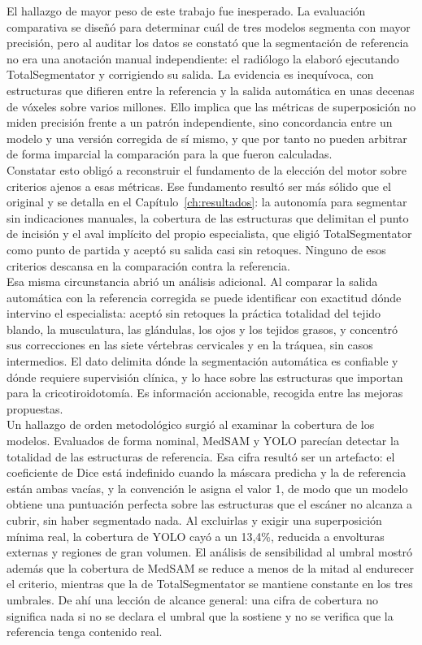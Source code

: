 El hallazgo de mayor peso de este trabajo fue inesperado. La evaluación comparativa se diseñó para determinar cuál de tres modelos segmenta con mayor precisión, pero al auditar los datos se constató que la segmentación de referencia no era una anotación manual independiente: el radiólogo la elaboró ejecutando TotalSegmentator y corrigiendo su salida. La evidencia es inequívoca, con estructuras que difieren entre la referencia y la salida automática en unas decenas de vóxeles sobre varios millones. Ello implica que las métricas de superposición no miden precisión frente a un patrón independiente, sino concordancia entre un modelo y una versión corregida de sí mismo, y que por tanto no pueden arbitrar de forma imparcial la comparación para la que fueron calculadas.\\

Constatar esto obligó a reconstruir el fundamento de la elección del motor sobre criterios ajenos a esas métricas. Ese fundamento resultó ser más sólido que el original y se detalla en el Capítulo~\ref{ch:resultados}: la autonomía para segmentar sin indicaciones manuales, la cobertura de las estructuras que delimitan el punto de incisión y el aval implícito del propio especialista, que eligió TotalSegmentator como punto de partida y aceptó su salida casi sin retoques. Ninguno de esos criterios descansa en la comparación contra la referencia.\\

Esa misma circunstancia abrió un análisis adicional. Al comparar la salida automática con la referencia corregida se puede identificar con exactitud dónde intervino el especialista: aceptó sin retoques la práctica totalidad del tejido blando, la musculatura, las glándulas, los ojos y los tejidos grasos, y concentró sus correcciones en las siete vértebras cervicales y en la tráquea, sin casos intermedios. El dato delimita dónde la segmentación automática es confiable y dónde requiere supervisión clínica, y lo hace sobre las estructuras que importan para la cricotiroidotomía. Es información accionable, recogida entre las mejoras propuestas.\\

Un hallazgo de orden metodológico surgió al examinar la cobertura de los modelos. Evaluados de forma nominal, MedSAM y YOLO parecían detectar la totalidad de las estructuras de referencia. Esa cifra resultó ser un artefacto: el coeficiente de Dice está indefinido cuando la máscara predicha y la de referencia están ambas vacías, y la convención le asigna el valor 1, de modo que un modelo obtiene una puntuación perfecta sobre las estructuras que el escáner no alcanza a cubrir, sin haber segmentado nada. Al excluirlas y exigir una superposición mínima real, la cobertura de YOLO cayó a un 13,4\%, reducida a envolturas externas y regiones de gran volumen. El análisis de sensibilidad al umbral mostró además que la cobertura de MedSAM se reduce a menos de la mitad al endurecer el criterio, mientras que la de TotalSegmentator se mantiene constante en los tres umbrales. De ahí una lección de alcance general: una cifra de cobertura no significa nada si no se declara el umbral que la sostiene y no se verifica que la referencia tenga contenido real.\\


